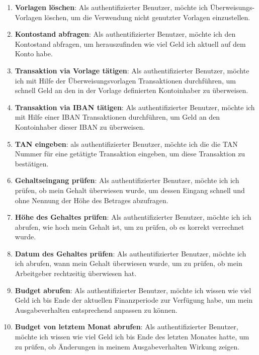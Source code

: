 \begin{enumerate}
\item\textbf{Vorlagen löschen}: Als authentifizierter Benutzer, möchte ich Überweisungs-Vorlagen löschen, um die Verwendung nicht genutzter Vorlagen einzustellen.

\item\textbf{Kontostand abfragen}: Als authentifizierter Benutzer, möchte ich den Kontostand abfragen, um herauszufinden wie viel Geld ich aktuell auf dem Konto habe.

\item\textbf{Transaktion via Vorlage tätigen}: Als authentifizierter Benutzer, möchte ich mit Hilfe der Überweisungsvorlagen Transaktionen durchführen, um schnell Geld an den in der Vorlage definierten Kontoinhaber zu überweisen.

\item\textbf{Transaktion via IBAN tätigen}: Als authentifizierter Benutzer, möchte ich mit Hilfe einer IBAN Transaktionen durchführen, um Geld an den Kontoinhaber dieser IBAN zu überweisen.

\item\textbf{TAN eingeben}: als authentifizierter Benutzer, möchte ich die die TAN Nummer für eine getätigte Transaktion eingeben, um diese Transaktion zu bestätigen.

\item\textbf{Gehaltseingang prüfen}: Als authentifizierter Benutzer, möchte ich ich prüfen, ob mein Gehalt überwiesen wurde, um dessen Eingang schnell und ohne Nennung der Höhe des Betrages abzufragen.

\item\textbf{Höhe des Gehaltes prüfen}: Als authentifizierter Benutzer, möchte ich ich abrufen, wie hoch mein Gehalt ist, um zu prüfen, ob es korrekt verrechnet wurde.

\item\textbf{Datum des Gehaltes prüfen}: Als authentifizierter Benutzer, möchte ich ich abrufen, wann mein Gehalt überwiesen wurde, um zu prüfen, ob mein Arbeitgeber rechtzeitig überwiesen hat.

\item\textbf{Budget abrufen}: Als authentifizierter Benutzer, möchte ich wissen wie viel Geld ich bis Ende der aktuellen Finanzperiode zur Verfügung habe, um mein Ausgabeverhalten entsprechend anpassen zu können.

\item\textbf{Budget von letztem Monat abrufen}: Als authentifizierter Benutzer, möchte ich wissen wie viel Geld ich bis Ende des letzten Monates hatte, um zu prüfen, ob Änderungen in meinem Ausgabeverhalten Wirkung zeigen.


\end{enumerate}
